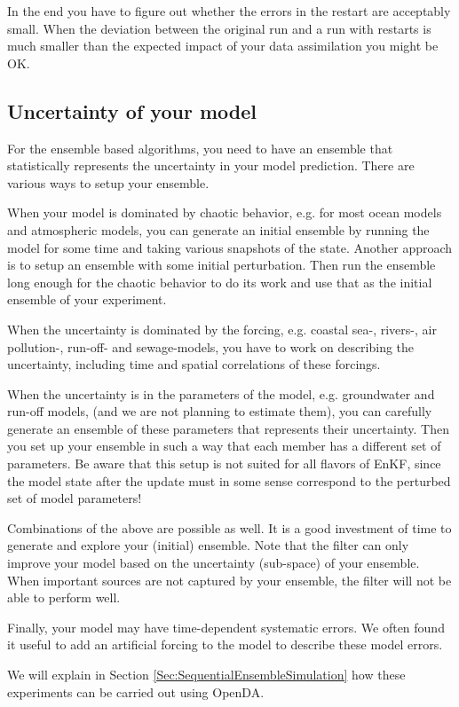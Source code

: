 In the end you have to figure out whether the errors in the restart are acceptably small. When the deviation between the original run and a run with restarts is much smaller than the expected impact of your data assimilation you might be OK.

\subsection{Uncertainty of your model}
For the ensemble based algorithms, you need to have an ensemble that statistically represents the uncertainty in your model prediction. There are various ways to setup your ensemble. 

When your model is dominated by chaotic behavior, e.g. for most ocean models and atmospheric models, you can generate an initial ensemble by running the model for some time and taking various snapshots of the state. Another approach is to setup an ensemble with some initial perturbation. Then run the ensemble long enough for the chaotic behavior to do its work and use that as the initial ensemble of your experiment.

When the uncertainty is dominated by the forcing, e.g. coastal sea-, rivers-, air pollution-, run-off- and sewage-models, you have to work on describing the uncertainty, including time and spatial correlations of these forcings.

When the uncertainty is in the parameters of the model, e.g.  groundwater and run-off models, (and we are not planning to estimate them), you can carefully generate an ensemble of these parameters that represents their uncertainty. Then you set up your ensemble in such a way that each member has a different set of parameters.  Be aware that this setup is not suited for all flavors of EnKF, since the model state after the update must in some sense correspond to the perturbed set of model parameters!

Combinations of the above are possible as well. It is a good investment of time to generate and explore your (initial) ensemble. Note that the filter can only improve your model based on the uncertainty (sub-space) of your ensemble. When important sources are not captured by your ensemble, the filter will not be able to perform well. 

Finally, your model may have time-dependent systematic errors. We often found it useful to add an artificial forcing to the model to describe these model errors.

We will explain in Section \ref{Sec:SequentialEnsembleSimulation} how these experiments can be carried out using OpenDA.


